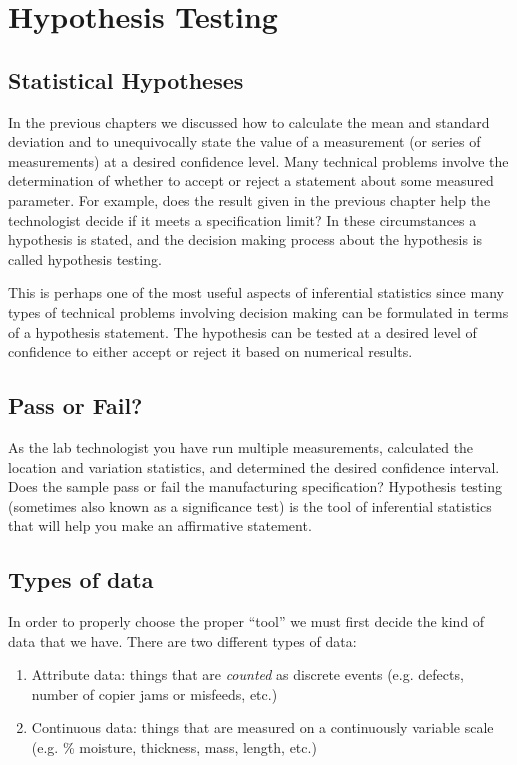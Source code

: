 \chapter{Hypothesis Testing}
\section{Statistical Hypotheses}
In the previous chapters we discussed how to calculate the mean and standard deviation and to unequivocally state the value of a measurement (or series of measurements) at a desired confidence level.  Many technical problems involve the determination of whether to accept or reject a statement about some measured parameter.  For example, does the result given in the previous chapter help the technologist decide if it meets a specification limit?  In these circumstances a hypothesis is stated, and the decision making process about the hypothesis is called hypothesis testing.

This is perhaps one of the most useful aspects of inferential statistics since many types of technical problems involving decision making can be formulated in terms of a hypothesis statement. The hypothesis can be tested at a desired level of confidence to either accept or reject it based on numerical results.

\section{Pass or Fail?}
As the lab technologist you have run multiple measurements, calculated the location and variation statistics, and determined the desired confidence interval.  Does the sample pass or fail the manufacturing specification?  Hypothesis testing (sometimes also known as a significance test) is the tool of inferential statistics that will help you make an affirmative statement.

\section{Types of data}
In order to properly choose the proper ``tool'' we must first decide the kind of data that we have. There are two different types of data:
\begin{enumerate}
\item Attribute data: things that are \textit{counted} as discrete events (e.g. defects, number of copier jams or mis\-feeds, etc.)
\item Continuous data: things that are measured on a continuously variable scale (e.g. \% moisture, thickness, mass, length, etc.)
\end{enumerate}



